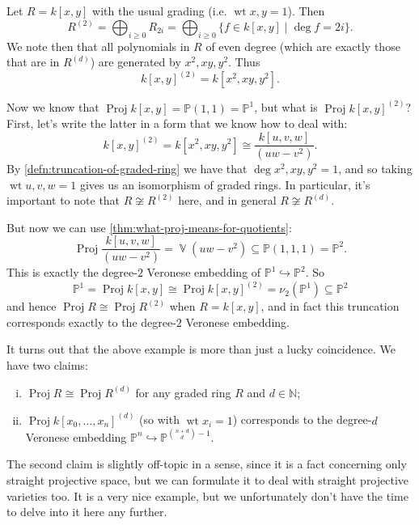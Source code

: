 \documentclass[10pt,notitlepage]{article}
\numberwithin{equation}{subsection}
\DeclareMathOperator{\proj}{Proj}
\DeclareMathOperator{\wt}{wt}
\DeclareMathOperator{\van}{\mathbb{V}}
\newcommand{\pee}{\mathbb{P}}
\newcommand{\nn}{\mathbb{N}}
\newcommand{\kzn}{k[x_0,\ldots,x_n]}
\begin{document}
    \begin{example}\label{ex:veronese-grading-thing}
        Let $R=k[x,y]$ with the usual grading (i.e. $\wt x,y=1$).
        Then
        \[
            R^{(2)} = \bigoplus_{i\geqslant0}R_{2i} = \bigoplus_{i\geqslant0}\{f\in k[x,y] \mid \deg f=2i\}.
        \]
        We note then that all polynomials in $R$ of even degree (which are exactly those that are in $R^{(d)}$) are generated by $x^2,xy,y^2$.
        Thus
        \[
            k[x,y]^{(2)} = k[x^2,xy,y^2].
        \]

        Now we know that $\proj k[x,y]=\pee(1,1)=\pee^1$, but what is $\proj k[x,y]^{(2)}$?
        First, let's write the latter in a form that we know how to deal with:
        \[
            k[x,y]^{(2)} = k[x^2,xy,y^2] \cong \frac{k[u,v,w]}{(uw-v^2)}.
        \]
        By \cref{defn:truncation-of-graded-ring} we have that $\deg x^2,xy,y^2=1$, and so taking $\wt u,v,w=1$ gives us an isomorphism of graded rings.
        In particular, it's important to note that $R\not\cong R^{(2)}$ here, and in general $R\not\cong R^{(d)}$.

        But now we can use \cref{thm:what-proj-means-for-quotients}:
        \[
            \proj\frac{k[u,v,w]}{(uw-v^2)} = \van(uw-v^2)\subseteq\pee(1,1,1) = \pee^2.
        \]
        This is exactly the degree-$2$ Veronese embedding of $\pee^1\hookrightarrow\pee^2$.
        So
        \[
            \pee^1 = \proj k[x,y] \cong \proj k[x,y]^{(2)} = \nu_2(\pee^1)\subseteq\pee^2
        \]
        and hence $\proj R\cong\proj R^{(2)}$ when $R=k[x,y]$, and in fact this truncation corresponds exactly to the degree-$2$ Veronese embedding.
    \end{example}

    It turns out that the above example is more than just a lucky coincidence.
    We have two claims:
    \begin{enumerate}[(i)]
        \item $\proj R\cong\proj R^{(d)}$ for any graded ring $R$ and $d\in\nn$;
        \item $\proj\kzn^{(d)}$ (so with $\wt x_i=1$) corresponds to the degree-$d$ Veronese embedding $\pee^n\hookrightarrow\pee^{\binom{n+d}{d} - 1}$.
    \end{enumerate}

    The second claim is slightly off-topic in a sense, since it is a fact concerning only straight projective space, but we can formulate it to deal with straight projective varieties too.
    It is a very nice example, but we unfortunately don't have the time to delve into it here any further.
\end{document}
